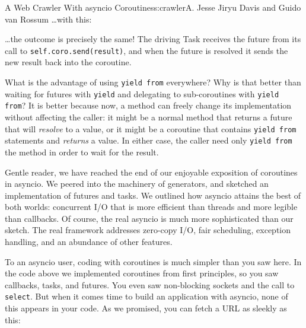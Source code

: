 \begin{aosachapter}{A Web Crawler With asyncio Coroutines}{s:crawler}{A. Jesse Jiryu Davis and Guido van Rossum}
\ldots{}with this:

\begin{Shaded}
\begin{Highlighting}[]
  
\end{Highlighting}
\end{Shaded}

\ldots{}the outcome is precisely the same! The driving Task receives the
future from its call to \texttt{self.coro.send(result)}, and when the
future is resolved it sends the new result back into the coroutine.

What is the advantage of using \texttt{yield from} everywhere? Why is
that better than waiting for futures with \texttt{yield} and delegating
to sub-coroutines with \texttt{yield from}? It is better because now, a
method can freely change its implementation without affecting the
caller: it might be a normal method that returns a future that will
\emph{resolve} to a value, or it might be a coroutine that contains
\texttt{yield from} statements and \emph{returns} a value. In either
case, the caller need only \texttt{yield from} the method in order to
wait for the result.

Gentle reader, we have reached the end of our enjoyable exposition of
coroutines in asyncio. We peered into the machinery of generators, and
sketched an implementation of futures and tasks. We outlined how asyncio
attains the best of both worlds: concurrent I/O that is more efficient
than threads and more legible than callbacks. Of course, the real
asyncio is much more sophisticated than our sketch. The real framework
addresses zero-copy I/O, fair scheduling, exception handling, and an
abundance of other features.

To an asyncio user, coding with coroutines is much simpler than you saw
here. In the code above we implemented coroutines from first principles,
so you saw callbacks, tasks, and futures. You even saw non-blocking
sockets and the call to \texttt{select}. But when it comes time to build
an application with asyncio, none of this appears in your code. As we
promised, you can fetch a URL as sleekly as this:

\begin{Shaded}
\begin{Highlighting}[]
     
          
          
\end{Highlighting}
\end{Shaded}


\end{aosachapter}

